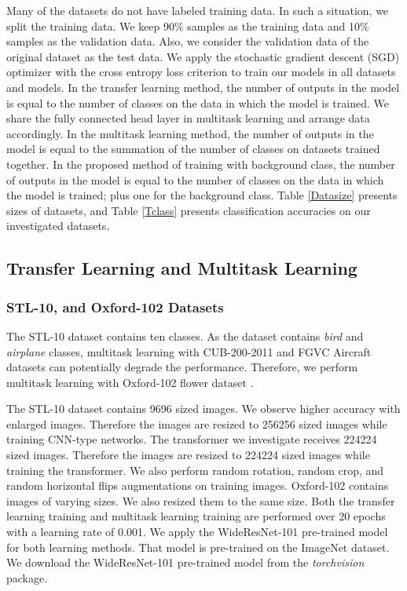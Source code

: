 \documentclass{article}
\begin{document}
Many of the datasets do not have labeled training data. In such a situation, we split the training data. We keep 90\% samples as the training data and 10\% samples as the validation data. Also, we consider the validation data of the original dataset as the test data. We apply the stochastic gradient descent (SGD) optimizer with the cross entropy loss criterion to train our models in all datasets and models.
In the transfer learning method, the number of outputs in the model is equal to the number of classes on the data in which the model is trained.
We share the fully connected head layer in multitask learning and arrange data accordingly. In the multitask learning method, the number of outputs in the model is equal to the summation of the number of classes on datasets trained together. In the proposed method of training with background class, the number of outputs in the model is equal to the number of classes on the data in which the model is trained; plus one for the background class.
Table \ref{Datasize} presents sizes of datasets, and Table \ref{Tclass} presents classification accuracies on our investigated datasets.

\subsection{Transfer Learning and Multitask Learning}
\subsubsection{STL-10, and Oxford-102 Datasets}
The STL-10 dataset \cite{coates2011analysis} contains ten classes. As the dataset contains \emph{bird} and \emph{airplane} classes, multitask learning with CUB-200-2011 and FGVC Aircraft datasets can potentially degrade the performance. Therefore, we perform multitask learning with Oxford-102 flower dataset \cite{nilsback2008automated}.

The STL-10 dataset contains 9696 sized images. We observe higher accuracy with enlarged images. Therefore the images are resized to 256256 sized images while training CNN-type networks. The transformer we investigate receives 224224 sized images. Therefore the images are resized to 224224 sized images while training the transformer. We also perform random rotation, random crop, and random horizontal flips augmentations on training images. Oxford-102 contains images of varying sizes. We also resized them to the same size. Both the transfer learning training and multitask learning training are performed over 20 epochs with a learning rate of 0.001. We apply the WideResNet-101 pre-trained model for both learning methods. That model is pre-trained on the ImageNet dataset. We download the WideResNet-101 pre-trained model from the \emph{torchvision} package. 
\end{document}
